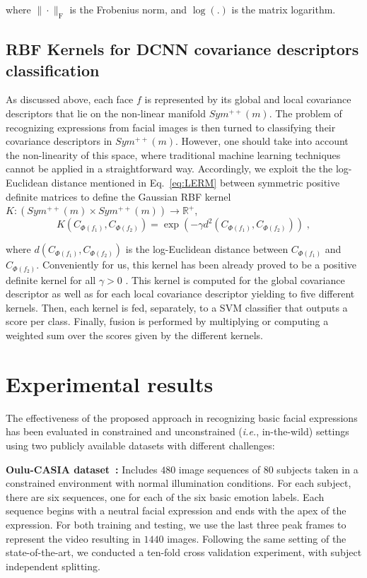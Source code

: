 \documentclass{bmvc2k}
\begin{document}
\noindent
where $\|\cdot\|_{\textrm{F}}$ is the Frobenius norm, and $\log(.)$ is the matrix logarithm. 

\subsection{RBF Kernels for DCNN covariance descriptors classification} 
As discussed above, each face $f$ is represented by its global and local covariance descriptors that lie on the non-linear manifold $Sym^{++}(m)$.
The problem of recognizing expressions from facial images is then turned to classifying their covariance descriptors in $Sym^{++}(m)$. However, one should take into account the non-linearity of this space, where traditional machine learning techniques cannot be applied in a straightforward way. Accordingly, we exploit the the log-Euclidean distance mentioned in Eq.~\eqref{eq:LERM} between symmetric positive definite matrices to define the Gaussian RBF kernel $K : (Sym^{++}(m) \times Sym^{++}(m)) \rightarrow \mathbb{R}^{+}$,
\begin{equation}
\label{eq:kernel}
K(C_{\Phi(f_1)}, C_{\Phi(f_2)})=\exp (-\gamma d^2(C_{\Phi(f_1)}, C_{\Phi(f_2)})) \; ,
\end{equation}

\noindent
where $d(C_{\Phi(f_1)}, C_{\Phi(f_2)})$ is the log-Euclidean distance between $C_{\Phi(f_1)}$ and $C_{\Phi(f_2)}$. Conveniently for us, this kernel has been already proved to be a positive definite kernel for all $\gamma > 0$ \cite{jayasumana2015kernel}. 
This kernel is computed for the global covariance descriptor as well as for each local covariance descriptor yielding to five different kernels. Then, each kernel is fed, separately, to a SVM classifier that outputs a score per class. Finally, fusion is performed by multiplying or computing a weighted sum over the scores given by the different kernels. 
\section{Experimental results}\label{sect:results}
The effectiveness of the proposed approach in recognizing basic facial expressions has been evaluated in constrained and unconstrained (\emph{i.e.}, in-the-wild) settings using two publicly available datasets with different challenges:

\textbf{Oulu-CASIA dataset~\cite{zhao2011facial}:} Includes $480$ image sequences of $80$ subjects taken in a constrained environment with normal illumination conditions. For each subject, there are six sequences, one for each of the six basic emotion labels. Each sequence begins with a neutral facial expression and ends with the apex of the expression.
For both training and testing, we use the last three peak frames to represent the video resulting in $1440$ images. Following the same setting of the state-of-the-art, we conducted a ten-fold cross validation experiment, with subject independent splitting. 
\end{document}
